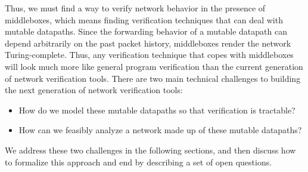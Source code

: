 Thus, we must find a way to verify network behavior in the presence of middleboxes, which means finding verification techniques that can deal with mutable datapaths. Since the forwarding behavior of a mutable datapath can depend arbitrarily on the past packet history, middleboxes render the network Turing-complete. Thus, any verification technique that copes with middleboxes will look much more like general program verification than the current generation of network verification tools. There are two main technical challenges to building the next generation of network verification tools:
\begin{itemize}
\item How do we model these mutable datapaths so that verification is tractable?
\item How can we feasibly analyze a network made up of these mutable datapaths?
\end{itemize}
We address these two challenges in the following sections, and then discuss  how to formalize this approach and end by describing a set of open questions.